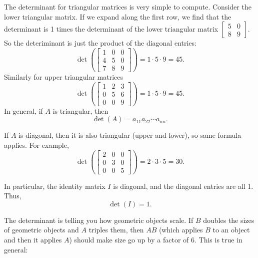The determinant for triangular matrices is very simple to compute.  
Consider the lower triangular matrix.  If we expand along the
first row, we find that the determinant is 1 times the determinant
of the lower triangular matrix $\left[ \begin{smallmatrix} 5 & 0 \\ 8 & 9
\end{smallmatrix} \right]$.  So the deteriminant is just the
product of the diagonal entries:
\begin{equation*}
\det \left(
\begin{bmatrix}
1 & 0 & 0 \\
4 & 5 & 0 \\
7 & 8 & 9
\end{bmatrix} 
\right)
=
1 \cdot 5 \cdot 9 = 45 .
\end{equation*}
Similarly for upper triangular matrices
\begin{equation*}
\det \left(
\begin{bmatrix}
1 & 2 & 3 \\
0 & 5 & 6 \\
0 & 0 & 9
\end{bmatrix}
\right)
=
1 \cdot 5 \cdot 9 = 45 .
\end{equation*}
In general, if $A$ is triangular, then
\begin{equation*}
\det (A) = a_{11} a_{22} \cdots a_{nn} .
\end{equation*}

If $A$ is diagonal, then it is also triangular (upper and lower), so
same formula applies.  For example,
\begin{equation*}
\det \left(
\begin{bmatrix}
2 & 0 & 0 \\
0 & 3 & 0 \\
0 & 0 & 5
\end{bmatrix}
\right)
=
2 \cdot 3 \cdot 5 = 30 .
\end{equation*}

In particular, the identity matrix $I$ is diagonal, and the diagonal entries
are all 1.  Thus,
\begin{equation*}
\det(I) = 1 .
\end{equation*}

\medskip

The determinant is telling you how geometric objects scale.
If $B$ doubles the sizes of geometric objects and $A$ triples them,
then $AB$ (which applies $B$ to an object and then it applies $A$) should make size
go up by a factor of $6$.  This is true in general:

